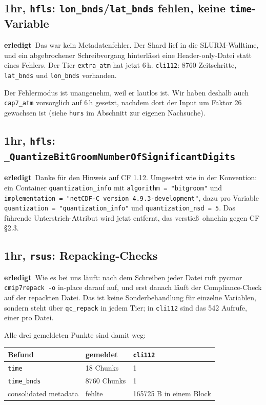 \documentclass[11pt,a4paper]{article}
\newcommand{\code}[1]{\texttt{\small #1}}
\newcommand{\ok}{\textcolor{green!45!black}{\textbf{erledigt}}}
\begin{document}
\subsection*{1hr, \code{hfls}: \code{lon\_bnds}/\code{lat\_bnds} fehlen, keine \code{time}-Variable}
\ok\ Das war kein Metadatenfehler. Der Shard lief in die SLURM-Walltime, und ein
abgebrochener Schreibvorgang hinterl\"asst eine Header-only-Datei statt eines Fehlers.
Der Tier \code{extra\_atm} hat jetzt 6\,h. \code{cli112}: 8760 Zeitschritte,
\code{lat\_bnds} und \code{lon\_bnds} vorhanden.

Der Fehlermodus ist unangenehm, weil er lautlos ist. Wir haben deshalb auch
\code{cap7\_atm} vorsorglich auf 6\,h gesetzt, nachdem dort der Input um Faktor 26
gewachsen ist (siehe \code{hurs} im Abschnitt zur eigenen Nachsuche).

\subsection*{1hr, \code{hfls}: \code{\_QuantizeBitGroomNumberOfSignificantDigits}}
\ok\ Danke f\"ur den Hinweis auf CF 1.12. Umgesetzt wie in der Konvention:
ein Container \code{quantization\_info} mit \code{algorithm = "bitgroom"} und
\code{implementation = "netCDF-C version 4.9.3-development"}, dazu pro Variable
\code{quantization = "quantization\_info"} und \code{quantization\_nsd = 5}.
Das f\"uhrende Unterstrich-Attribut wird jetzt entfernt, das verstie\ss\ ohnehin
gegen CF \S2.3.

\subsection*{1hr, \code{rsus}: Repacking-Checks}
\ok\ Wie es bei uns l\"auft: nach dem Schreiben jeder Datei ruft pycmor
\code{cmip7repack -o} in-place darauf auf, und erst danach l\"auft der
Compliance-Check auf der repackten Datei. Das ist keine Sonderbehandlung f\"ur
einzelne Variablen, sondern steht \"uber \code{qc\_repack} in jedem Tier; in
\code{cli112} sind das 542 Aufrufe, einer pro Datei.

Alle drei gemeldeten Punkte sind damit weg:

\begin{center}
\begin{tabular}{lll}
\toprule
\textbf{Befund} & \textbf{gemeldet} & \textbf{\code{cli112}} \\
\midrule
\code{time} & 18 Chunks & 1 \\
\code{time\_bnds} & 8760 Chunks & 1 \\
consolidated metadata & fehlte & 165725 B in einem Block \\
\bottomrule
\end{tabular}
\end{center}
\end{document}
